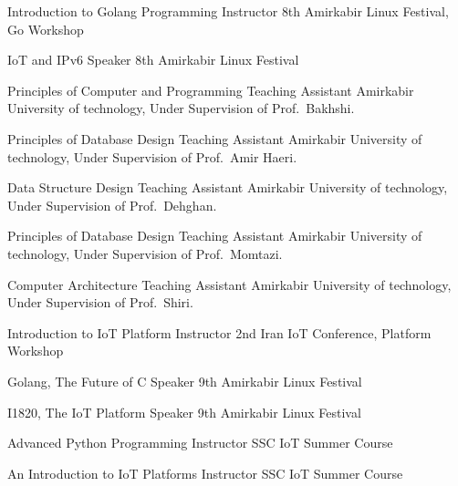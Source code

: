 \documentclass[]{friggeri-cv} %
\begin{document}
\begin{entrylist}
	{Introduction to Golang Programming}
	{Instructor}
	{8th Amirkabir Linux Festival, Go Workshop}
	

	{IoT and IPv6}
	{Speaker}
	{8th Amirkabir Linux Festival}


	{Principles of Computer and Programming}
	{Teaching Assistant}
	{Amirkabir University of technology, Under Supervision of Prof.\ Bakhshi.}


	{Principles of Database Design}
	{Teaching Assistant}
	{Amirkabir University of technology, Under Supervision of Prof.\ Amir Haeri.}

	
	{Data Structure Design}
	{Teaching Assistant}
	{Amirkabir University of technology, Under Supervision of Prof.\ Dehghan.}

	
	{Principles of Database Design}
	{Teaching Assistant}
	{Amirkabir University of technology, Under Supervision of Prof.\ Momtazi.}


	{Computer Architecture}
	{Teaching Assistant}
	{Amirkabir University of technology, Under Supervision of Prof.\ Shiri.}

	
	{Introduction to IoT Platform}
	{Instructor}
	{2nd Iran IoT Conference, Platform Workshop}


	{Golang, The Future of C}
	{Speaker}
	{9th Amirkabir Linux Festival}


	{I1820, The IoT Platform}
	{Speaker}
	{9th Amirkabir Linux Festival}


	{Advanced Python Programming}
	{Instructor}
	{SSC IoT Summer Course}


	{An Introduction to IoT Platforms}
	{Instructor}
	{SSC IoT Summer Course}


\end{entrylist}
\end{document}
